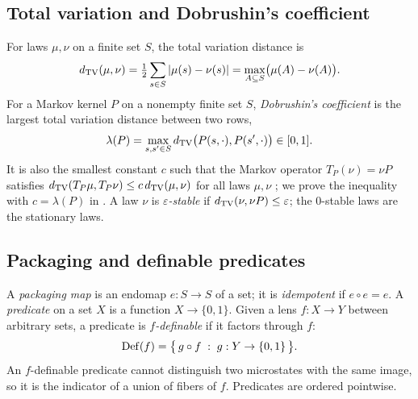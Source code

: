 \subsection{Total variation and Dobrushin's coefficient}
For laws $\mu,\nu$ on a finite set $S$, the total variation distance is
\[
  d_{\mathrm{TV}}(\mu,\nu)=\tfrac12\sum_{s\in S}|\mu(s)-\nu(s)|=\max_{A\subseteq S}\bigl(\mu(A)-\nu(A)\bigr).
\]
For a Markov kernel $P$ on a nonempty finite set $S$, \emph{Dobrushin's coefficient} is the largest total variation distance between two rows,
\[
  \lambda(P)=\max_{s,s'\in S}d_{\mathrm{TV}}\bigl(P(s,\cdot),P(s',\cdot)\bigr)\in[0,1].
\]
It is also the smallest constant $c$ such that the Markov operator $T_P(\nu)=\nu P$ satisfies $d_{\mathrm{TV}}(T_P\mu,T_P\nu)\le c\,d_{\mathrm{TV}}(\mu,\nu)$ for all laws $\mu,\nu$ \citep{Dobrushin1956,Seneta2006}; we prove the inequality with $c=\lambda(P)$ in .
A law $\nu$ is \emph{$\varepsilon$-stable} if $d_{\mathrm{TV}}(\nu,\nu P)\le\varepsilon$; the $0$-stable laws are the stationary laws.

\subsection{Packaging and definable predicates}
A \emph{packaging map} is an endomap $e:S\to S$ of a set; it is \emph{idempotent} if $e\circ e=e$.
A \emph{predicate} on a set $X$ is a function $X\to\{0,1\}$.
Given a lens $f:X\to Y$ between arbitrary sets, a predicate is \emph{$f$-definable} if it factors through $f$:
\[
  \mathrm{Def}(f)=\bigl\{\,g\circ f\;:\;g:Y\to\{0,1\}\,\bigr\}.
\]
An $f$-definable predicate cannot distinguish two microstates with the same image, so it is the indicator of a union of fibers of $f$.
Predicates are ordered pointwise.
